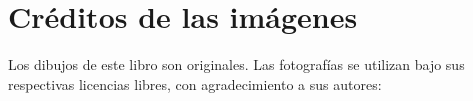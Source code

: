 \chapter*{Créditos de las imágenes}

\begingroup\sloppy

Los dibujos de este libro son originales. Las fotografías se utilizan
bajo sus respectivas licencias libres, con agradecimiento a sus
autores:

